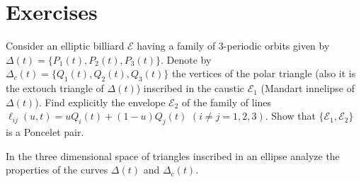 \section{Exercises}
\label{sec:appC-exercises}

\begin{exercise}
   Consider an elliptic billiard $\mathcal{E}$ having a family of 3-periodic orbits given by $\Delta(t)=\{P_1(t),P_2(t),P_3(t)\}$. Denote by $\Delta_c(t)=\{Q_1(t),Q_2(t),Q_3(t)\}$ the vertices of the polar triangle (also it is the extouch triangle of $\Delta(t)$) inscribed in the caustic $\mathcal{E}_1$ (Mandart innelipse of $\Delta(t)$).  Find explicitly the envelope $\mathcal{E}_2$ of the family of lines $\ell_{ij}(u,t)=uQ_i(t)+(1-u)Q_j(t)$ $(i\ne j=1,2,3)$. Show that $\{\mathcal{E}_1,\mathcal{E}_2\}$ is a Poncelet pair.
   
   In the three dimensional space of triangles inscribed in an ellipse analyze the properties of the   curves $ \Delta(t)$ and $ \Delta_c(t).$
\end{exercise}
